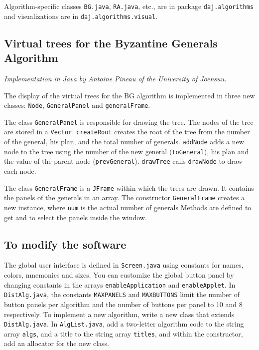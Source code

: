 \documentclass[11pt]{article}
\newcommand{\p}[1]{\texttt{#1}}
\begin{document}
Algorithm-specific classes \p{BG.java}, \p{RA.java}, etc.,
are in package \p{daj.algorithms} and visualizations are in
\p{daj.algorithms.visual}.

\subsection{Virtual trees for the Byzantine Generals Algorithm}

\emph{Implementation in Java by Antoine Pineau of the University of Joensuu.}

The display of the virtual trees for the BG algorithm is
implemented in three new classes: \p{Node},
\p{GeneralPanel} and \p{generalFrame}.

The class \p{GeneralPanel} is responsible for drawing the tree.
The nodes of the tree are stored in a \p{Vector}.
\p{createRoot} creates the root of the tree from the number
of the general, his plan, and the total number of generals.
\p{addNode} adds a new node to the tree using the number
of the new general (\p{toGeneral}), his plan and the value of the
parent node (\p{prevGeneral}).
\p{drawTree} calls \p{drawNode}  to draw each node.

The class \p{GeneralFrame} is a \p{JFrame} within which the trees are drawn.
It contains the panels of the generals in an array.
The constructor \p{GeneralFrame} creates a new
instance, where \p{num} is the actual number of generals
Methods are defined to get and to select the panels
inside the window.

\subsection{To modify the software}

The global user interface is defined in \p{Screen.java} using
constants for names, colors, mnemonics and sizes. You can
customize the global button panel by changing constants in
the arrays \p{enableApplication} and \p{enableApplet}.
In \p{DistAlg.java}, the constants \p{MAXPANELS} and \p{MAXBUTTONS} limit the
number of button panels per algorithm and the number of buttons
per panel to 10 and 8 respectively.
To implement a new algorithm,
write a new class that extends \p{DistAlg.java}. In
\p{AlgList.java}, add a two-letter algorithm code to the string
array \p{algs}, and a title to the string array \p{titles}, and
within the constructor, add an allocator for the new class.
\end{document}
